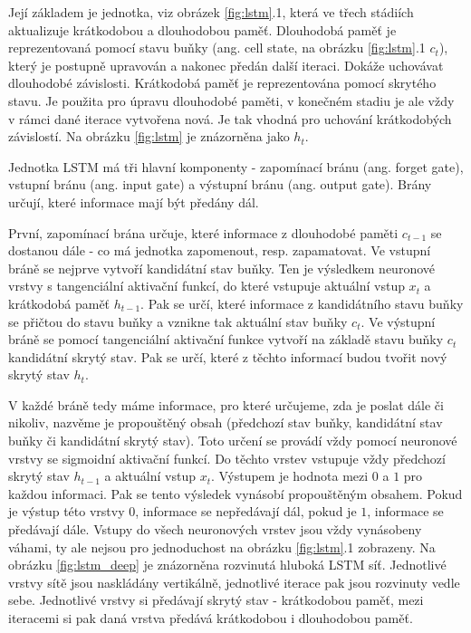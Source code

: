 Její základem je jednotka, viz obrázek \ref{fig:lstm}.1, která ve třech
stádiích aktualizuje krátkodobou a dlouhodobou paměť. Dlouhodobá paměť je
reprezentovaná pomocí stavu buňky (ang. cell state, na obrázku \ref{fig:lstm}.1
$c_t$), který je postupně upravován a nakonec předán další iteraci. Dokáže
uchovávat dlouhodobé závislosti. Krátkodobá paměť je reprezentována pomocí
skrytého stavu. Je použita pro úpravu dlouhodobé paměti, v konečném stadiu je
ale vždy v rámci dané iterace vytvořena nová. Je tak vhodná pro uchování
krátkodobých závislostí. Na obrázku \ref{fig:lstm} je znázorněna jako $h_t$.

Jednotka LSTM má tři hlavní komponenty - zapomínací bránu (ang. forget gate),
vstupní bránu (ang. input gate) a výstupní bránu (ang. output gate). Brány
určují, které informace mají být předány dál.

První, zapomínací brána určuje, které informace z dlouhodobé paměti $c_{t-1}$
se dostanou dále - co má jednotka zapomenout, resp. zapamatovat. Ve vstupní
bráně se nejprve vytvoří kandidátní stav buňky. Ten je výsledkem neuronové
vrstvy s tangenciální aktivační funkcí, do které vstupuje aktuální vstup $x_t$
a krátkodobá paměť $h_{t-1}$. Pak se určí, které informace z kandidátního stavu
buňky se přičtou do stavu buňky a vznikne tak aktuální stav buňky $c_t$. Ve
výstupní bráně se pomocí tangenciální aktivační funkce vytvoří na základě stavu
buňky $c_t$ kandidátní skrytý stav. Pak se určí, které z těchto informací budou
tvořit nový skrytý stav $h_t$.

V každé bráně tedy máme informace, pro které určujeme, zda je poslat dále či
nikoliv, nazvěme je propouštěný obsah (předchozí stav buňky, kandidátní stav
buňky či kandidátní skrytý stav). Toto určení se provádí vždy pomocí neuronové
vrstvy se sigmoidní aktivační funkcí. Do těchto vrstev vstupuje vždy předchozí
skrytý stav $h_{t-1}$ a aktuální vstup $x_t$. Výstupem je hodnota mezi $0$ a
$1$ pro každou informaci. Pak se tento výsledek vynásobí propouštěným obsahem.
Pokud je výstup této vrstvy $0$, informace se nepředávají dál, pokud je $1$,
informace se předávají dále. Vstupy do všech neuronových vrstev jsou vždy
vynásobeny váhami, ty ale nejsou pro jednoduchost na obrázku \ref{fig:lstm}.1
zobrazeny. Na obrázku \ref{fig:lstm_deep} je znázorněna rozvinutá hluboká LSTM
síť. Jednotlivé vrstvy sítě jsou naskládány vertikálně, jednotlivé iterace pak
jsou rozvinuty vedle sebe. Jednotlivé vrstvy si předávají skrytý stav -
krátkodobou paměť, mezi iteracemi si pak daná vrstva předává krátkodobou i
dlouhodobou paměť.

